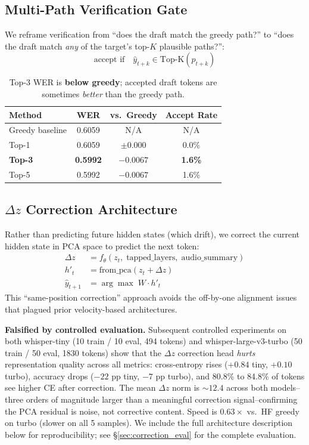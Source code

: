 \documentclass[11pt,a4paper]{article}
\begin{document}
\subsection{Multi-Path Verification Gate}

We reframe verification from ``does the draft match the greedy path?'' to ``does the draft match \emph{any} of the target's top-$K$ plausible paths?'':
\begin{equation}
    \text{accept if}\quad \hat{y}_{t+k} \in \mathrm{Top\text{-}K}(p_{t+k})
\end{equation}

\begin{table}[H]
\centering
\small
\begin{tabular}{@{}lccc@{}}
\toprule
\textbf{Method} & \textbf{WER} & \textbf{vs.\ Greedy} & \textbf{Accept Rate} \\
\midrule
Greedy baseline & 0.6059 & N/A & N/A \\
Top-1 & 0.6059 & $\pm 0.000$ & 0.0\% \\
\textbf{Top-3} & \textbf{0.5992} & $\mathbf{-0.0067}$ & \textbf{1.6\%} \\
Top-5 & 0.5992 & $-0.0067$ & 1.6\% \\
\bottomrule
\end{tabular}
\caption{Top-3 WER is \textbf{below greedy}; accepted draft tokens are sometimes \emph{better} than the greedy path.}
\label{tab:multipath}
\end{table}

\subsection{$\Delta z$ Correction Architecture}
\label{sec:dz_arch}

Rather than predicting future hidden states (which drift), we correct the current hidden state in PCA space to predict the next token:
\begin{align}
    \Delta z &= f_\theta(z_t,\; \text{tapped\_layers},\; \text{audio\_summary}) \\
    h'_t &= \mathrm{from\_pca}(z_t + \Delta z) \\
    \hat{y}_{t+1} &= \arg\max\; W \cdot h'_t
\end{align}
This ``same-position correction'' approach avoids the off-by-one alignment issues that plagued prior velocity-based architectures.

\noindent\textbf{Falsified by controlled evaluation.}
Subsequent controlled experiments on both whisper-tiny (10 train / 10 eval, 494 tokens) and whisper-large-v3-turbo (50 train / 50 eval, 1830 tokens) show that the $\Delta z$ correction head \emph{hurts} representation quality across all metrics:
cross-entropy rises ($+0.84$ tiny, $+0.10$ turbo), accuracy drops ($-22$ pp tiny, $-7$ pp turbo), and 80.8\% to 84.8\% of tokens see higher CE after correction.
The mean $\Delta z$ norm is ${\sim}12.4$ across both models--three orders of magnitude larger than a meaningful correction signal--confirming the PCA residual is noise, not corrective content.
Speed is $0.63\times$ vs.\ HF greedy on turbo (slower on all 5 samples).
We include the full architecture description below for reproducibility; see \S\ref{sec:correction_eval} for the complete evaluation.
\end{document}
